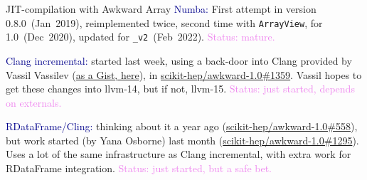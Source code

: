 \documentclass[aspectratio=169]{beamer}
\begin{document}
\begin{frame}{JIT-compilation with Awkward Array}
\vspace{0.5 cm}
\textcolor{darkblue}{Numba:} First attempt in version 0.8.0~(Jan~2019), reimplemented twice, second time with \texttt{ArrayView}, for 1.0~(Dec~2020), updated for \texttt{_v2}~(Feb~2022). \textcolor{violet}{Status: mature.}

\vspace{0.75 cm}
\textcolor{darkblue}{Clang incremental:} started last week, using a back-door into Clang provided by Vassil Vassilev (\textcolor{blue}{\href{https://gist.github.com/jpivarski/aad015ac893a0d9cca6c6f42a90a9505}{as a Gist, here}}), in \textcolor{blue}{\href{https://github.com/scikit-hep/awkward-1.0/pull/1359}{scikit-hep/awkward-1.0\#1359}}. Vassil hopes to get these changes into llvm-14, but if not, llvm-15. \textcolor{violet}{Status: just started, depends on externals.}

\vspace{0.75 cm}
\textcolor{darkblue}{RDataFrame/Cling:} thinking about it a year ago (\textcolor{blue}{\href{https://github.com/scikit-hep/awkward-1.0/issues/558}{scikit-hep/awkward-1.0\#558}}), but work started (by Yana Osborne) last month (\textcolor{blue}{\href{https://github.com/scikit-hep/awkward-1.0/pull/1295}{scikit-hep/awkward-1.0\#1295}}). Uses a lot of the same infrastructure as Clang incremental, with extra work for RDataFrame integration. \textcolor{violet}{Status: just started, but a safe bet.}

\end{frame}
\end{document}
